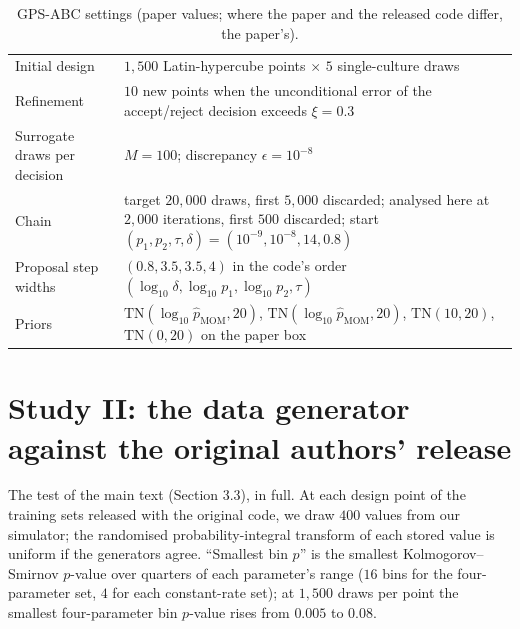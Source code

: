 \documentclass[11pt]{article}
\begin{document}
\begin{table}[h]
\centering
\caption{GPS-ABC settings (paper values; where the paper and the released code differ, the paper's).}
\label{stab:gps}
\small
\begin{tabular}{ll}
\toprule
Initial design & $1{,}500$ Latin-hypercube points $\times$ $5$ single-culture draws \\
Refinement & $10$ new points when the unconditional error of the accept/reject decision exceeds $\xi=0.3$ \\
Surrogate draws per decision & $M=100$; discrepancy $\epsilon=10^{-8}$ \\
Chain & target $20{,}000$ draws, first $5{,}000$ discarded; analysed here at $2{,}000$ iterations, first $500$ discarded; start $(p_1,p_2,\tau,\delta)=(10^{-9},10^{-8},14,0.8)$ \\
Proposal step widths & $(0.8,3.5,3.5,4)$ in the code's order $(\log_{10}\delta,\log_{10}p_1,\log_{10}p_2,\tau)$ \\
Priors & $\mathrm{TN}(\log_{10}\hat p_{\mathrm{MOM}},20)$, $\mathrm{TN}(\log_{10}\hat p_{\mathrm{MOM}},20)$, $\mathrm{TN}(10,20)$, $\mathrm{TN}(0,20)$ on the paper box \\
\bottomrule
\end{tabular}
\end{table}

\section{Study II: the data generator against the original authors' release}
\label{ssec:s4-validate}

The test of the main text (Section 3.3), in full. At each design point of the training sets released with the original
code, we draw $400$ values from our simulator; the randomised probability-integral transform of each stored value is uniform
if the generators agree. ``Smallest bin $p$'' is the smallest Kolmogorov--Smirnov $p$-value over quarters of each parameter's range
($16$ bins for the four-parameter set, $4$ for each constant-rate set); at $1{,}500$ draws per point the smallest four-parameter bin
$p$-value rises from $0.005$ to $0.08$.

\begin{table}[h]
\centering
\caption{Our generator against the training sets released by the original authors.}
\label{stab:validate}
\scriptsize

\end{table}
\end{document}
